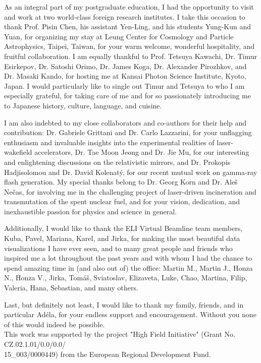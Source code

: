 \documentclass[10pt, a4paper, twoside, openright]{report}
\begin{document}
As an integral part of my postgraduate education, I had the opportunity to visit and work at two world-class foreign research institutes. I take this occasion to thank Prof. Pisin Chen, his assistant Yen-Ling, and his students Yung-Kun and Yuan, for organizing my stay at Leung Center for Cosmology and Particle Astrophysics, Taipei, Taiwan, for your warm welcome, wonderful hospitality, and fruitful collaboration. I am equally thankful to Prof. Tetsuya Kawachi, Dr. Timur Esirkepov, Dr. Satoshi Orimo, Dr. James Koga, Dr. Alexander Pirozhkov, and Dr. Masaki Kando, for hosting me at Kansai Photon Science Institute, Kyoto, Japan. I would particularly like to single out Timur and Tetsuya to who I am especially grateful, for taking care of me and for so passionately introducing me to Japanese history, culture, language, and cuisine.

I am also indebted to my close collaborators and co-authors for their help and contribution: Dr. Gabriele Grittani and Dr. Carlo Lazzarini, for your unflagging enthusiasm and invaluable insights into the experimental realities of laser-wakefield accelerators, Dr. Tae Moon Jeong and Dr. Jie Mu, for our interesting and enlightening discussions on the relativistic mirrors, and Dr. Prokopis Hadjisolomou and Dr. David Kolenatý, for our recent mutual work on gamma-ray flash generation. My special thanks belong to Dr. Georg Korn and Dr. Aleš Nečas, for involving me in the challenging project of laser-driven incineration and transmutation of the spent nuclear fuel, and for your vision, dedication, and inexhaustible passion for physics and science in general.

Additionally, I would like to thank the ELI Virtual Beamline team members, Kuba, Pavel, Mariana, Karel, and Jirka, for making the most beautiful data visualizations I have ever seen, and to many great people and friends who inspired me a lot throughout the past years and with whom I had the chance to spend amazing time in (and also out of) the office: Martin M., Martin J., Honza N., Honza V., Jirka, Tomáš, Sviatoslav, Elizaveta, Luke, Chao, Martina, Filip, Valeria, Hana, Sebastian, and many others.

Last, but definitely not least, I would like to thank my family, friends, and in particular Adéla, for your endless support and encouragement. Without you none of this would indeed be possible. \\

\noindent This work was supported by the project "High Field Initiative" (Grant No. CZ.02.1.01/0.0/0.0/\\15\_003/0000449) from the European Regional Development Fund.
\end{document}
